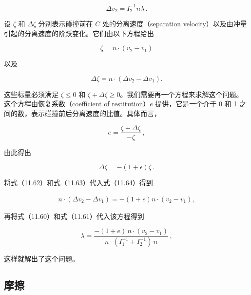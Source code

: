 \documentclass[10pt,a4paper]{book}
\theoremstyle{thmstyle} %
\theoremstyle{defstyle} %
\theoremstyle{prostyle} %
\begin{document}
$$
\Delta v _{2} = I _{2} ^{-1} n \lambda \, .
$$



设 $\zeta$ 和 $\Delta\zeta$ 分别表示碰撞前在 $C$ 处的分离速度（separation velocity）以及由冲量引起的分离速度的阶跃变化。它们由以下方程给出



$$
\zeta = n \cdot \left( v _{2} - v _{1} \right)
$$



以及



$$
\Delta \zeta = n \cdot \left( \Delta v _{2} - \Delta v _{1} \right) .
$$



这些标量必须满足 $\zeta \leq 0$ 和 $\zeta + \Delta \zeta \geq 0$。我们需要再一个方程来求解这个问题。这个方程由恢复系数（coefficient of restitution）$e$ 提供，它是一个介于 0 和 1 之间的数，表示碰撞前后分离速度的比值。具体而言，



$$
e = \frac { \zeta + \Delta \zeta } { - \zeta } \, ,
$$



由此得出



$$
\Delta \zeta = - ( 1 + \epsilon ) \zeta \, .
$$



将式（11.62）和式（11.63）代入式（11.64）得到



$$
\begin{array}{r} { n \cdot \left( \Delta v _{2} - \Delta v _{1} \right) = - \left( 1 + e \right) n \cdot \left( v _{2} - v _{1} \right) , } \end{array}
$$



再将式（11.60）和式（11.61）代入该方程得到



$$
\lambda = \frac { - ( 1 + e ) \, n \cdot ( v _{2} - v _{1} ) } { n \cdot ( I _{1} ^{-1} + I _{2} ^{-1} ) \, n } \, ,
$$



这样就解出了这个问题。



\subsection{摩擦}
\end{document}
